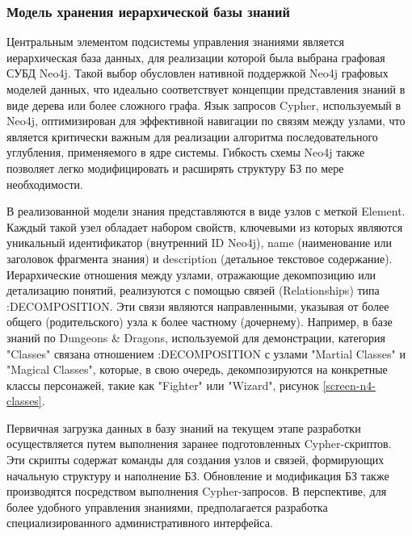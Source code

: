\subsubsection{Модель хранения иерархической базы знаний}

Центральным элементом подсистемы управления знаниями является иерархическая база данных, для реализации которой была выбрана графовая СУБД Neo4j. Такой выбор обусловлен нативной поддержкой Neo4j графовых моделей данных, что идеально соответствует концепции представления знаний в виде дерева или более сложного графа. Язык запросов Cypher, используемый в Neo4j, оптимизирован для эффективной навигации по связям между узлами, что является критически важным для реализации алгоритма последовательного углубления, применяемого в ядре системы. Гибкость схемы Neo4j также позволяет легко модифицировать и расширять структуру БЗ по мере необходимости.


В реализованной модели знания представляются в виде узлов с меткой Element. Каждый такой узел обладает набором свойств, ключевыми из которых являются уникальный идентификатор (внутренний ID Neo4j), name (наименование или заголовок фрагмента знания) и description (детальное текстовое содержание). Иерархические отношения между узлами, отражающие декомпозицию или детализацию понятий, реализуются с помощью связей (Relationships) типа :DECOMPOSITION. Эти связи являются направленными, указывая от более общего (родительского) узла к более частному (дочернему). Например, в базе знаний по Dungeons & Dragons, используемой для демонстрации, категория "Classes" связана отношением :DECOMPOSITION с узлами "Martial Classes" и "Magical Classes", которые, в свою очередь, декомпозируются на конкретные классы персонажей, такие как "Fighter" или "Wizard", рисунок \ref{screen-n4-classes}.

Первичная загрузка данных в базу знаний на текущем этапе разработки осуществляется путем выполнения заранее подготовленных Cypher-скриптов. Эти скрипты содержат команды для создания узлов и связей, формирующих начальную структуру и наполнение БЗ. Обновление и модификация БЗ также производятся посредством выполнения Cypher-запросов. В перспективе, для более удобного управления знаниями, предполагается разработка специализированного административного интерфейса.

